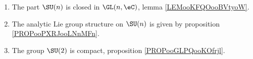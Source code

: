 
\begin{enumerate}
	\item
	      The part \( \SU(n)\) is closed in \( \GL(n,\eC)\), lemma \ref{LEMooKFQOooBVtyoW}.
	\item
	      The analytic Lie group structure on \( \SU(n)\) is given by proposition \ref{PROPooPXRJooLNnMFn}.
	\item
	      The group \( \SU(2)\) is compact, proposition \ref{PROPooGLPQooKOfrjl}.
\end{enumerate}

